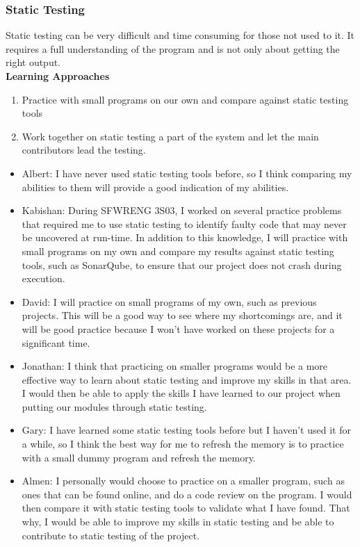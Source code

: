 \documentclass[12pt, titlepage]{article}
\begin{document}
\subsubsection{Static Testing}
Static testing can be very difficult and time consuming for those not used to
it. It requires a full understanding of the program and is not only about
getting the right output. \\

\noindent \textbf{Learning Approaches}
\begin{enumerate}
    \item Practice with small programs on our own and compare against static
    testing tools
    \item Work together on static testing a part of the system and let the main
    contributors lead the testing.
\end{enumerate}

\begin{itemize}
    \item Albert: I have never used static testing tools before, so I think
    comparing my abilities to them will provide a good indication of my
    abilities.
    \item Kabishan: During SFWRENG 3S03, I worked on several practice problems
    that required me to use static testing to identify faulty code that may
    never be uncovered at run-time. In addition to this knowledge, I will
    practice with small programs on my own and compare my results against static
    testing tools, such as SonarQube, to ensure that our project does not crash
    during execution.
    \item David: I will practice on small programs of my own, such as previous
    projects. This will be a good way to see where my shortcomings are, and it
    will be good practice because I won't have worked on these projects for a
    significant time.
    \item Jonathan: I think that practicing on smaller programs would be a more
    effective way to learn about static testing and improve my skills in that
    area. I would then be able to apply the skills I have learned to our project
    when putting our modules through static testing.
    \item Gary: I have learned some static testing tools before but I haven't
    used it for a while, so I think the best way for me to refresh the memory is
    to practice with a small dummy program and refresh the memory.
    \item Almen: I personally would choose to practice on a smaller program,
    such as ones that can be found online, and do a code review on the program.
    I would then compare it with static testing tools to validate what I have
    found. That why, I would be able to improve my skills in static testing and
    be able to contribute to static testing of the project.
\end{itemize}
\end{document}
